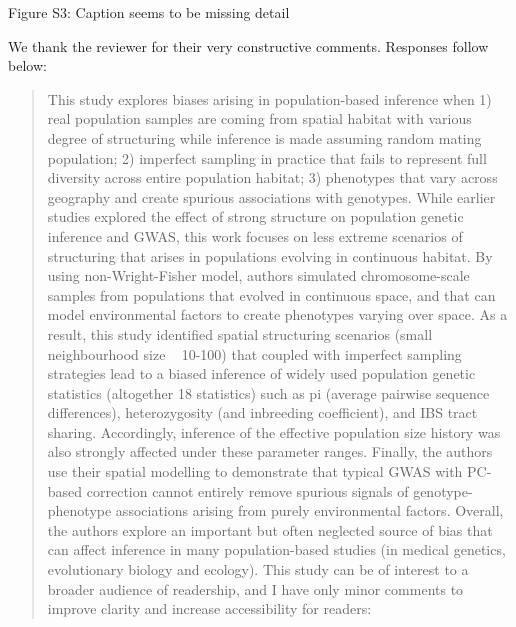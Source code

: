 
\begin{point}{Figure S3:}
    Caption seems to be missing detail 
\end{point}




We thank the reviewer for their very constructive comments. Responses follow below:

\begin{quote}
    This study explores biases arising in population-based inference when 1)
    real population samples are coming from spatial habitat with various degree
    of structuring while inference is made assuming random mating population;
    2) imperfect sampling in practice that fails to represent full diversity
    across entire population habitat; 3) phenotypes that vary across geography
    and create spurious associations with genotypes. While earlier studies
    explored the effect of strong structure on population genetic inference and
    GWAS, this work focuses on less extreme scenarios of structuring that
    arises in populations evolving in continuous habitat. By using
    non-Wright-Fisher model, authors simulated chromosome-scale samples from
    populations that evolved in continuous space, and that can model
    environmental factors to create phenotypes varying over space. As a result,
    this study identified spatial structuring scenarios (small neighbourhood
    size ~ 10-100) that coupled with imperfect sampling strategies lead to a
    biased inference of widely used population genetic statistics (altogether
    18 statistics) such as pi (average pairwise sequence differences),
    heterozygosity (and inbreeding coefficient), and IBS tract sharing.
    Accordingly, inference of the effective population size history was also
    strongly affected under these parameter ranges. Finally, the authors use
    their spatial modelling to demonstrate that typical GWAS with PC-based
    correction cannot entirely remove spurious signals of genotype-phenotype
    associations arising from purely environmental factors.  Overall, the
    authors explore an important but often neglected source of bias that can
    affect inference in many population-based studies (in medical genetics,
    evolutionary biology and ecology). This study can be of interest to a
    broader audience of readership, and I have only minor comments to improve
    clarity and increase accessibility for readers:
\end{quote}


